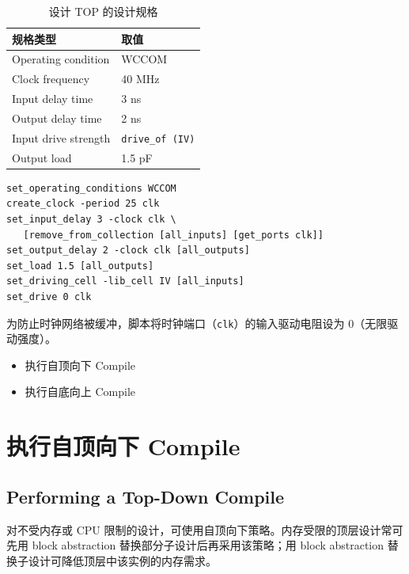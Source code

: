 \begin{table}[htbp]
\centering
\caption{设计 TOP 的设计规格}
\label{tab:dce-top-spec}
\begin{tabular}{@{}ll@{}}
\toprule
规格类型 & 取值 \\
\midrule
Operating condition & WCCOM \\
Clock frequency & 40 MHz \\
Input delay time & 3 ns \\
Output delay time & 2 ns \\
Input drive strength & \texttt{drive\_of (IV)} \\
Output load & 1.5 pF \\
\bottomrule
\end{tabular}
\end{table}

\begin{lstlisting}[caption={设计 TOP 的约束文件（defaults.com）},label={ex:dce-defaults-con}]
set_operating_conditions WCCOM
create_clock -period 25 clk
set_input_delay 3 -clock clk \
   [remove_from_collection [all_inputs] [get_ports clk]]
set_output_delay 2 -clock clk [all_outputs]
set_load 1.5 [all_outputs]
set_driving_cell -lib_cell IV [all_inputs]
set_drive 0 clk
\end{lstlisting}

\begin{noteBox}
为防止时钟网络被缓冲，脚本将时钟端口（\texttt{clk}）的输入驱动电阻设为 0（无限驱动强度）。
\end{noteBox}

\begin{seeAlsoBox}
\begin{itemize}
  \item 执行自顶向下 Compile
  \item 执行自底向上 Compile
\end{itemize}
\end{seeAlsoBox}

\section{执行自顶向下 Compile}
\subsection*{Performing a Top-Down Compile}

对不受内存或 CPU 限制的设计，可使用自顶向下策略。内存受限的顶层设计常可先用 block abstraction 替换部分子设计后再采用该策略；用 block abstraction 替换子设计可降低顶层中该实例的内存需求。

